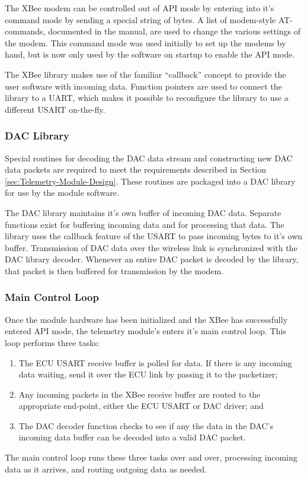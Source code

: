 The XBee modem can be controlled out of API mode by entering into it's command mode by sending a special string of bytes. A list of modem-style AT-commands, documented in the manual, are used to change the various settings of the modem. This command mode was used initially to set up the modems by hand, but is now only used by the software on startup to enable the API mode.

The XBee library makes use of the familiar ``callback'' concept to provide the user software with incoming data. Function pointers are used to connect the library to a UART, which makes it possible to reconfigure the library to use a different USART on-the-fly.

\subsubsection{DAC Library}
\label{sec:dac_library}

Special routines for decoding the DAC data stream and constructing new DAC data packets are required to meet the requirements described in Section \ref{sec:Telemetry-Module-Design}. These routines are packaged into a DAC library for use by the module software.

The DAC library maintains it's own buffer of incoming DAC data. Separate functions exist for buffering incoming data and for processing that data. The library uses the callback feature of the USART to pass incoming bytes to it's own buffer. Transmission of DAC data over the wireless link is synchronized with the DAC library decoder. Whenever an entire DAC packet is decoded by the library, that packet is then buffered for transmission by the modem.

\subsubsection{Main Control Loop}

Once the module hardware has been initialized and the XBee has successfully entered API mode, the telemetry module's enters it's main control loop. This loop performs three tasks:

\begin{enumerate}
  \item The ECU USART receive buffer is polled for data. If there is any incoming data waiting, send it over the ECU link by passing it to the packetizer;
  \item Any incoming packets in the XBee receive buffer are routed to the appropriate end-point, either the ECU USART or DAC driver; and
  \item The DAC decoder function checks to see if any the data in the DAC's incoming data buffer can be decoded into a valid DAC packet.
\end{enumerate}

The main control loop runs these three tasks over and over, processing incoming data as it arrives, and routing outgoing data as needed. 
